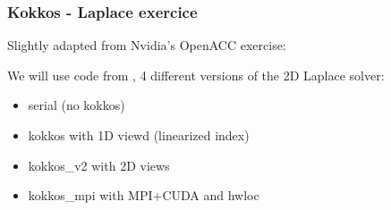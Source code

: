 \begin{frame}
  \frametitle{Kokkos - Laplace exercice}

  Slightly adapted from Nvidia's OpenACC exercise:\\

  We will use code from , 4 different versions of the 2D Laplace solver:
  \begin{itemize}
  \item serial (no kokkos)
  \item kokkos with 1D viewd (linearized index)
  \item kokkos_v2 with 2D views
  \item kokkos_mpi with MPI+CUDA and hwloc
  \end{itemize}
  
\end{frame}